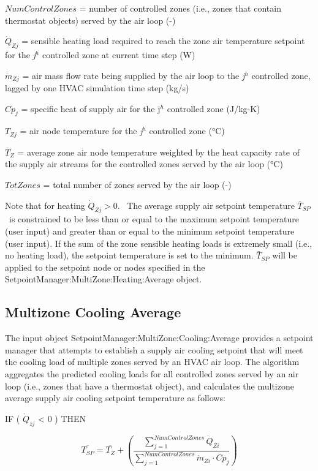 \(NumControlZones\) = number of controlled zones (i.e., zones that contain thermostat objects) served by the air loop (-)

\({\dot Q_{Zj}}\) = sensible heating load required to reach the zone air temperature setpoint for the \emph{j}\(^{h}\) controlled zone at current time step (W)

\({\dot m_{Zj}}\) = air mass flow rate being supplied by the air loop to the \emph{j}\(^{h}\) controlled zone, lagged by one HVAC simulation time step (kg/s)

\(C{p_j}\) = specific heat of supply air for the j\(^{h}\) controlled zone (J/kg-K)

\({T_{Zj}}\) = air node temperature for the \emph{j}\(^{h}\) controlled zone (°C)

\({\overline T_Z}\) = average zone air node temperature weighted by the heat capacity rate of the supply air streams for the controlled zones served by the air loop (°C)

\(TotZones\) = total number of zones served by the air loop (-)

Note that for heating \({\dot Q_{Zj}} > 0.\) ~The average supply air setpoint temperature \({\bar T_{SP}}\) ~is constrained to be less than or equal to the maximum setpoint temperature (user input) and greater than or equal to the minimum setpoint temperature (user input). If the sum of the zone sensible heating loads is extremely small (i.e., no heating load), the setpoint temperature is set to the minimum. \({\bar T_{SP}}\) will be applied to the setpoint node or nodes specified in the SetpointManager:MultiZone:Heating:Average object.

\subsection{Multizone Cooling Average}\label{multizone-cooling-average}

The input object SetpointManager:MultiZone:Cooling:Average provides a setpoint manager that attempts to establish a supply air cooling setpoint that will meet the cooling load of multiple zones served by an HVAC air loop. The algorithm aggregates the predicted cooling loads for all controlled zones served by an air loop (i.e., zones that have a thermostat object), and calculates the multizone average supply air cooling setpoint temperature as follows:

IF ( \({\dot Q_{zj}}\) \textless{} 0 ) THEN

\begin{equation}
\overline {{T_{SP}}}  = \overline {{T_Z}}  + \left( {\frac{{\sum\limits_{j = 1}^{NumControlZones} {{{\dot Q}_{Zi}}} }}{{\sum\limits_{j = 1}^{NumControlZones} {{{\dot m}_{Zi}}\cdot C{p_j}} }}} \right)
\end{equation}

